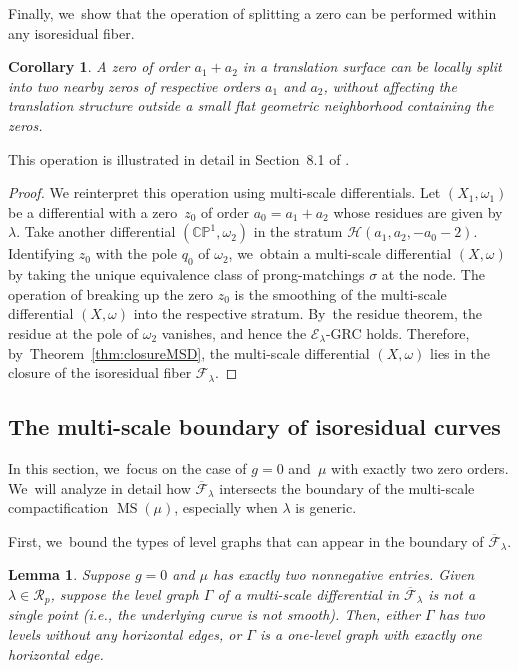 \documentclass[11pt]{article}
\newcommand{\ie}{i.e.,\xspace}
\newcommand\PP{{\mathbb P}}
\newcommand\calE{{\mathcal E}}
\newcommand\calF{{\mathcal F}}
\DeclareMathOperator\MS{MS}
\newtheorem{cor}[thm]{Corollary}
\newtheorem{lem}[thm]{Lemma}
\theoremstyle{definition}
\begin{document}
Finally, we~show that the operation of splitting a zero can be performed within any isoresidual fiber.
\begin{cor}\label{cor:breakingup}
A zero of order $a_1+a_2$ in a translation surface can be locally split into two nearby zeros of respective orders $a_1$ and $a_2$, without affecting the translation structure outside a small flat geometric neighborhood containing the zeros.
\end{cor}
This operation is illustrated in detail in Section~8.1 of \cite{EMZ}.

\begin{proof}
We reinterpret this operation using multi-scale differentials.
Let $(X_{1},\omega_{1})$ be a differential with a zero~$z_{0}$ of order $a_0=a_{1}+a_{2}$ whose residues are given by $\lambda$. Take another differential $(\mathbb C\PP^1, \omega_2)$ in the stratum $\mathcal{H}(a_{1},a_{2},-a_0-2)$. Identifying $z_0$ with the pole $q_0$ of $\omega_{2}$, we~obtain a multi-scale differential $(X,\omega)$ by taking the unique equivalence class of prong-matchings $\sigma$ at the node. The operation of breaking up the zero $z_{0}$ is the smoothing of the multi-scale differential $(X,\omega)$ into the respective stratum. By~the residue theorem, the residue at the pole of $\omega_{2}$ vanishes, and hence the $\calE_{\lambda}$-GRC holds. Therefore, by~Theorem~\ref{thm:closureMSD}, the multi-scale differential $(X,\omega)$ lies in the closure of the isoresidual fiber $\calF_{\lambda}$.
\end{proof}

\subsection{The multi-scale boundary of isoresidual curves}\label{sub:boundary}

In this section, we~focus on the case of $g=0$ and~$\mu$ with exactly two zero orders. We~will analyze in detail how $\overline{\mathcal F}_\lambda$ intersects the boundary of the multi-scale compactification $\MS(\mu)$, especially when $\lambda$ is generic.

First, we~bound the types of level graphs that can appear in the boundary of $\overline{\mathcal F}_\lambda$.

\begin{lem}\label{lem:residues}
Suppose $g=0$ and $\mu$ has exactly two nonnegative entries. Given $\lambda\in \mathcal{R}_{p}$, suppose the level graph $\Gamma$ of a multi-scale differential in $\overline{\mathcal{F}}_{\lambda}$ is not a single point (\ie the underlying curve is not smooth). Then, either $\Gamma$ has two levels without any horizontal edges, or $\Gamma$ is a one-level graph with exactly one horizontal edge.
\end{lem}
\end{document}
